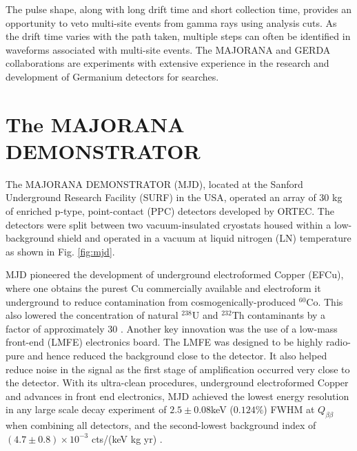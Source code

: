The pulse shape, along with long drift time and short collection time, provides an opportunity to veto multi-site events from gamma rays using analysis cuts. As the drift time varies with the path taken, multiple steps can often be identified in waveforms associated with multi-site events. The MAJORANA and GERDA collaborations are experiments with extensive experience in the research and development of Germanium detectors for {\onbb} searches.


\section{The MAJORANA DEMONSTRATOR}

The MAJORANA DEMONSTRATOR (MJD), located at the Sanford Underground Research Facility (SURF) in the USA, operated an array of 30 kg of enriched p-type, point-contact (PPC) detectors developed by ORTEC. The detectors were split between two vacuum-insulated cryostats housed within a low-background shield and operated in a vacuum at liquid nitrogen (LN) temperature as shown in Fig. \ref{fig:mjd}. 

MJD pioneered the development of underground electroformed Copper (EFCu), where one obtains the purest Cu commercially available and electroform it underground to reduce contamination from cosmogenically-produced $^{60}$Co. This also lowered the concentration of natural $^{238}$U and $^{232}$Th contaminants by a factor of approximately 30 \cite{Abgrall:2016cct}. Another key innovation was the use of a low-mass front-end (LMFE) electronics board. The LMFE was designed to be highly radio-pure and hence reduced the background close to the detector. It also helped reduce noise in the signal as the first stage of amplification occurred very close to the detector. With its ultra-clean procedures, underground electroformed Copper and advances in front end electronics, MJD achieved the lowest energy resolution in any large scale {\onbb} decay experiment of $2.5\pm0.08$keV ($0.124\%$) FWHM at $Q_{\beta\beta}$ when combining all detectors, and the second-lowest background index of $(4.7\pm 0.8) \times 10^{-3}$ cts/(keV kg yr) \cite{Majorana_2019nbd}.

